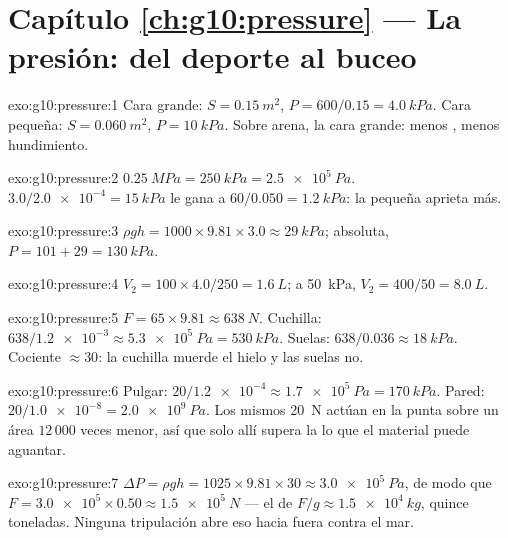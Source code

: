 \section*{Capítulo \ref{ch:g10:pressure} --- La presión: del deporte al buceo}

\begin{solution}{exo:g10:pressure:1}
Cara grande: $S = \qty{0.15}{m^2}$, $P = 600/0.15 = \qty{4.0}{kPa}$.
Cara pequeña: $S = \qty{0.060}{m^2}$, $P = \qty{10}{kPa}$. Sobre arena,
la cara grande: menos , menos hundimiento.
\end{solution}

\begin{solution}{exo:g10:pressure:2}
$\qty{0.25}{MPa} = \qty{250}{kPa} = \qty{2.5e5}{Pa}$.
$3.0/\num{2.0e-4} = \qty{15}{kPa}$ le gana a
$60/0.050 = \qty{1.2}{kPa}$: la  pequeña aprieta más.
\end{solution}

\begin{solution}{exo:g10:pressure:3}
$\rho g h = 1000 \times 9.81 \times 3.0 \approx \qty{29}{kPa}$;
absoluta, $P = 101 + 29 = \qty{130}{kPa}$.
\end{solution}

\begin{solution}{exo:g10:pressure:4}
$V_2 = 100 \times 4.0 / 250 = \qty{1.6}{L}$; a \qty{50}{kPa},
$V_2 = 400/50 = \qty{8.0}{L}$.
\end{solution}

\begin{solution}{exo:g10:pressure:5}
$F = 65 \times 9.81 \approx \qty{638}{N}$. Cuchilla:
$638/\num{1.2e-3} \approx \qty{5.3e5}{Pa} = \qty{530}{kPa}$. Suelas:
$638/0.036 \approx \qty{18}{kPa}$. Cociente $\approx 30$: la cuchilla
muerde el hielo y las suelas no.
\end{solution}

\begin{solution}{exo:g10:pressure:6}
Pulgar: $20/\num{1.2e-4} \approx \qty{1.7e5}{Pa} = \qty{170}{kPa}$.
Pared: $20/\num{1.0e-8} = \qty{2.0e9}{Pa}$. Los mismos \qty{20}{N}
actúan en la punta sobre un área $12\,000$ veces menor, así que solo
allí supera la  lo que el material puede aguantar.
\end{solution}

\begin{solution}{exo:g10:pressure:7}
$\Delta P = \rho g h = 1025 \times 9.81 \times 30 \approx
\qty{3.0e5}{Pa}$, de modo que
$F = \num{3.0e5} \times 0.50 \approx \qty{1.5e5}{N}$ --- el  de
$F/g \approx \qty{1.5e4}{kg}$, quince toneladas. Ninguna tripulación
abre eso hacia fuera contra el mar.
\end{solution}

